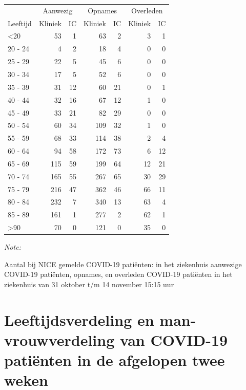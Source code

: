 \documentclass[
  english,
  man,floatsintext]{apa6}
\begin{document}
\begin{table}
\centering\begingroup\fontsize{10}{12}\selectfont

\begin{threeparttable}
\begin{tabular}{lrrrrrr}
\toprule
\multicolumn{1}{c}{ } & \multicolumn{2}{c}{Aanwezig} & \multicolumn{2}{c}{Opnames} & \multicolumn{2}{c}{Overleden} \\
\cmidrule(l{3pt}r{3pt}){2-3} \cmidrule(l{3pt}r{3pt}){4-5} \cmidrule(l{3pt}r{3pt}){6-7}
Leeftijd & Kliniek & IC & Kliniek & IC & Kliniek & IC\\
\midrule
<20 & 53 & 1 & 63 & 2 & 3 & 1\\
20 - 24 & 4 & 2 & 18 & 4 & 0 & 0\\
25 - 29 & 22 & 5 & 45 & 6 & 0 & 0\\
30 - 34 & 17 & 5 & 52 & 6 & 0 & 0\\
35 - 39 & 31 & 12 & 60 & 21 & 0 & 1\\
40 - 44 & 32 & 16 & 67 & 12 & 1 & 0\\
45 - 49 & 33 & 21 & 82 & 29 & 0 & 0\\
50 - 54 & 60 & 34 & 109 & 32 & 1 & 0\\
55 - 59 & 68 & 33 & 114 & 38 & 2 & 4\\
60 - 64 & 94 & 58 & 172 & 73 & 6 & 12\\
65 - 69 & 115 & 59 & 199 & 64 & 12 & 21\\
70 - 74 & 165 & 55 & 267 & 65 & 30 & 29\\
75 - 79 & 216 & 47 & 362 & 46 & 66 & 11\\
80 - 84 & 232 & 7 & 340 & 13 & 63 & 4\\
85 - 89 & 161 & 1 & 277 & 2 & 62 & 1\\
>90 & 70 & 0 & 121 & 0 & 35 & 0\\
\bottomrule
\end{tabular}
\begin{tablenotes}
\item \textit{Note: } 
\item Aantal bij NICE gemelde COVID-19 patiënten: in het ziekenhuis aanwezige COVID-19 patiënten, opnames, en overleden COVID-19 patiënten in het ziekenhuis van 31 oktober t/m 14 november 15:15 uur
\end{tablenotes}
\end{threeparttable}
\endgroup{}
\end{table}

\newpage

\hypertarget{leeftijdsverdeling-en-man-vrouwverdeling-van-covid-19-patiuxebnten-in-de-afgelopen-twee-weken}{%
\section{Leeftijdsverdeling en man-vrouwverdeling van COVID-19 patiënten in de afgelopen twee weken}\label{leeftijdsverdeling-en-man-vrouwverdeling-van-covid-19-patiuxebnten-in-de-afgelopen-twee-weken}}
\end{document}
